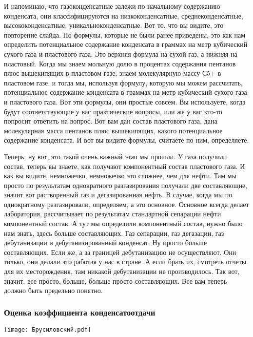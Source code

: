 \documentclass[main.tex]{subfiles}
\begin{document}
И напоминаю, что газоконденсатные залежи по начальному содержанию конденсата, они классифицируются на низкоконденсатные, среднеконденсатные, высококонденсатные, уникальноконденсатные.
Вот то, что вы видите, это повторение слайда.
Но формулы, которые не были ранее приведены, это как нам определить потенциальное содержание конденсата в граммах на метр кубический сухого газа и пластового газа.
Это верхняя формула на сухой газ, а нижняя на пластовый.
Когда мы знаем мольную долю в процентах содержания пентанов плюс вышекипящих в пластовом газе, знаем молекулярную массу С5+ в пластовом газе, и тогда мы, используя формулу, которую мы можем рассчитать, потенциальное содержание конденсата в граммах на метр кубический сухого газа и пластового газа.
Вот эти формулы, они простые совсем.
Вы используете, когда будут соответствующие у вас практические вопросы, или же у вас кто-то попросит ответить на вопрос.
Вот вам дан состав пластового газа, дана молекулярная масса пентанов плюс вышекипящих, какого потенциальное содержание конденсата.
И вот вы видите формулы, считаете по ним, определяете.

Теперь, ну вот, это такой очень важный этап мы прошли.
У газа получили состав, теперь вы знаете, как получают компонентный состав пластового газа.
И как вы видите, немножечко, немножечко это сложнее, чем для нефти.
Там мы просто по результатам однократного разгазирования получали две составляющие, значит вот растворенный газ и дегазированная нефть.
В случае, когда мы по однократному разгазировали, определяем, а это основное.
Основное всегда делает лаборатория, рассчитывает по результатам стандартной сепарации нефти компонентный состав.
А тут мы определили компонентный состав, нужно было нам знать, здесь больше составляющих.
Газ сепарации, газ дегазации, газ дебутанизации и дебутанизированный конденсат.
Ну просто больше составляющих.
Если же, а за границей дебутанизацию не осуществляют.
Они только, они делали это работая у нас в стране.
А если брать их, смотреть отчеты для их месторождения, там никакой дебутанизации не производилось.
Так вот, значит, все просто, больше, больше просто составляющих.
Все вам теперь должно быть предельно понятно.

\subsubsection{Оценка коэффициента конденсатоотдачи}

\begin{center}
\texttt{[image: Брусиловский.pdf]}
\end{center}
\end{document}
